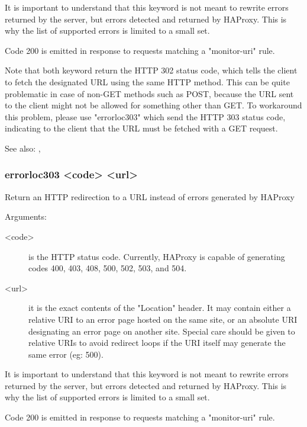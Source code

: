   It is important to understand that this keyword is not meant to rewrite
  errors returned by the server, but errors detected and returned by HAProxy.
  This is why the list of supported errors is limited to a small set.

  Code 200 is emitted in response to requests matching a "monitor-uri" rule.

  Note that both keyword return the HTTP 302 status code, which tells the
  client to fetch the designated URL using the same HTTP method. This can be
  quite problematic in case of non-GET methods such as POST, because the URL
  sent to the client might not be allowed for something other than GET. To
  workaround this problem, please use "errorloc303" which send the HTTP 303
  status code, indicating to the client that the URL must be fetched with a GET
  request.

  See also: , 

\subsubsection[errorloc303]{errorloc303 <code> <url>}
  Return an HTTP redirection to a URL instead of errors generated by HAProxy
  
  
  Arguments:
  \begin{description}
  \item[<code>]    is the HTTP status code. Currently, HAProxy is capable of
              generating codes 400, 403, 408, 500, 502, 503, and 504.

  \item[<url>]     it is the exact contents of the "Location" header. It may contain
              either a relative URI to an error page hosted on the same site,
              or an absolute URI designating an error page on another site.
              Special care should be given to relative URIs to avoid redirect
              loops if the URI itself may generate the same error (eg: 500).
  \end{description}

  It is important to understand that this keyword is not meant to rewrite
  errors returned by the server, but errors detected and returned by HAProxy.
  This is why the list of supported errors is limited to a small set.

  Code 200 is emitted in response to requests matching a "monitor-uri" rule.

